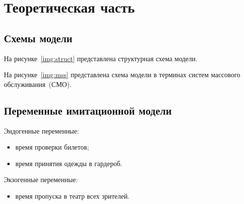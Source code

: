 \chapter{Теоретическая часть}

\section{Схемы модели}

На рисунке~\ref{img:struct} представлена структурная схема модели.


На рисунке~\ref{img:mss} представлена схема модели в терминах систем массового
обслуживания~(СМО).

\vspace{-0.5cm}
\vspace{-0.5cm}

\section{Переменные имитационной модели}

Эндогенные переменные:
\begin{itemize}
    \item время проверки билетов;
    \item время принятия одежды в гардероб.
\end{itemize}

Экзогенные переменные:
\begin{itemize}
    \item время пропуска в театр всех зрителей.
\end{itemize}


